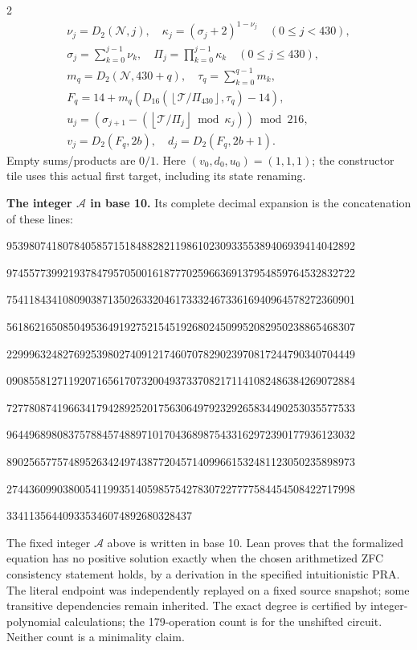 \documentclass[10pt]{article}
\newcommand{\fl}[1]{\left\lfloor#1\right\rfloor}
\begin{document}
\begin{multicols}{2}
\[\begin{gathered}
\nu_j=D_2(\mathcal N,j),\quad \kappa_j=(\sigma_j+2)^{1-\nu_j}\quad(0\le j<430),\\
\sigma_j=\sum_{k=0}^{j-1}\nu_k,\quad
\Pi_j=\prod_{k=0}^{j-1}\kappa_k\quad(0\le j\le430),\\
m_q=D_2(\mathcal N,430+q),\quad \tau_q=\sum_{k=0}^{q-1}m_k,\\
F_q=14+m_q(D_{16}(\fl{\mathcal T/\Pi_{430}},\tau_q)-14),\\
u_j=(\sigma_{j+1}-(\fl{\mathcal T/\Pi_j}\bmod\kappa_j))\bmod216,\\
v_j=D_2(F_q,2b),\quad d_j=D_2(F_q,2b+1).
\end{gathered}
\]
Empty sums/products are $0/1$. Here $(v_0,d_0,u_0)=(1,1,1)$; the constructor tile
uses this actual first target, including its state renaming.

\textbf{The integer $\mathcal A$ in base 10.}
Its complete decimal expansion is the concatenation of these lines:\par
\begingroup\fontsize{7.7}{8.2}\selectfont{}\par
95398074180784058571518488282119861023093355389406939414042892\par
97455773992193784795705001618777025966369137954859764532832722\par
75411843410809038713502633204617333246733616940964578272360901\par
56186216508504953649192752154519268024509952082950238865468307\par
22999632482769253980274091217460707829023970817244790340704449\par
09085581271192071656170732004937337082171141082486384269072884\par
72778087419663417942892520175630649792329265834490253035577533\par
96449689808375788457488971017043689875433162972390177936123032\par
89025657757489526342497438772045714099661532481123050235898973\par
27443609903800541199351405985754278307227777584454508422717998\par
334113564409335346074892680328437\par
\endgroup
\normalfont\fontsize{7.7}{8.2}\selectfont
The fixed integer $\mathcal A$ above is written in base 10. Lean proves that the formalized equation has no positive solution exactly
when the chosen arithmetized ZFC consistency statement holds, by a derivation
in the specified intuitionistic PRA. The literal endpoint was independently
replayed on a fixed source snapshot; some transitive dependencies remain
inherited. The exact degree is certified by integer-polynomial calculations;
the 179-operation count is for the unshifted circuit. Neither count is a
minimality claim.
\end{multicols}
\end{document}

